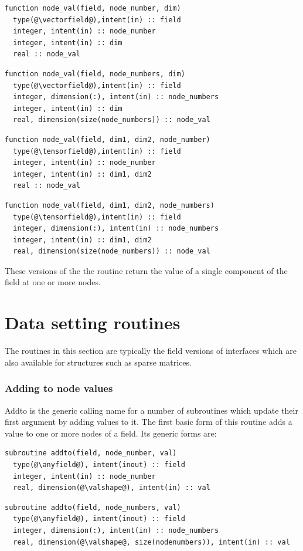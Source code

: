 \documentclass[a4paper, 11pt]{book}
\begin{document}
\begin{lstlisting}
function node_val(field, node_number, dim)
  type(@\vectorfield@),intent(in) :: field
  integer, intent(in) :: node_number
  integer, intent(in) :: dim
  real :: node_val
\end{lstlisting}
\begin{lstlisting}
function node_val(field, node_numbers, dim)
  type(@\vectorfield@),intent(in) :: field
  integer, dimension(:), intent(in) :: node_numbers
  integer, intent(in) :: dim
  real, dimension(size(node_numbers)) :: node_val
\end{lstlisting}
\begin{lstlisting}
function node_val(field, dim1, dim2, node_number)
  type(@\tensorfield@),intent(in) :: field
  integer, intent(in) :: node_number
  integer, intent(in) :: dim1, dim2
  real :: node_val
\end{lstlisting}
\begin{lstlisting}
function node_val(field, dim1, dim2, node_numbers)
  type(@\tensorfield@),intent(in) :: field
  integer, dimension(:), intent(in) :: node_numbers
  integer, intent(in) :: dim1, dim2
  real, dimension(size(node_numbers)) :: node_val
\end{lstlisting}
These versions of the the routine return the value of a single component of
the field at one or more nodes.

\section{Data setting routines}

The routines in this section are typically the field versions of interfaces
which are also available for structures such as sparse matrices.


\subsubsection{Adding to node values}

Addto is the generic calling name for a number of subroutines which update
their first argument by adding values to it. The first basic form of this
routine adds a value to one or more nodes of a field. Its generic forms are:

\begin{lstlisting}
subroutine addto(field, node_number, val)
  type(@\anyfield@), intent(inout) :: field
  integer, intent(in) :: node_number
  real, dimension(@\valshape@), intent(in) :: val
\end{lstlisting}
\begin{lstlisting}
subroutine addto(field, node_numbers, val)
  type(@\anyfield@), intent(inout) :: field
  integer, dimension(:), intent(in) :: node_numbers
  real, dimension(@\valshape@, size(nodenumbers)), intent(in) :: val
\end{lstlisting}
\end{document}
